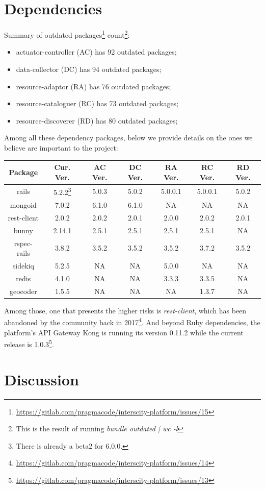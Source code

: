 \documentclass[paper=a4, fontsize=11pt]{scrartcl}
\numberwithin{equation}{section}    %
\numberwithin{figure}{section}      %
\numberwithin{table}{section}        %
\begin{document}
\section{Dependencies}
  Summary of outdated packages\footnote{\url{https://gitlab.com/pragmacode/interscity-platform/issues/15}} count\footnote{This is the result of running \textit{bundle outdated | wc -l}}:

  \begin{itemize}
    \item actuator-controller (AC) has 92 outdated packages;
    \item data-collector (DC) has 94 outdated packages;
    \item resource-adaptor (RA) has 76 outdated packages;
    \item resource-cataloguer (RC) has 73 outdated packages;
    \item resource-discoverer (RD) has 80 outdated packages;
  \end{itemize}

  Among all these dependency packages, below we provide details on the ones we believe are important to the project:

  \vspace{1em}

  \begin{center}
    \begin{tabu} to \textwidth {  c | c | c | c | c | c | c }
      \textbf{Package} & \textbf{Cur. Ver.} & \textbf{AC Ver.} & \textbf{DC Ver.} & \textbf{RA Ver.} & \textbf{RC Ver.} & \textbf{RD Ver.} \\ \hline \hline
      rails & 5.2.2\footnote{There is already a beta2 for 6.0.0.} & 5.0.3 & 5.0.2 & 5.0.0.1 & 5.0.0.1 & 5.0.2 \\ \hline
      mongoid & 7.0.2 & 6.1.0 & 6.1.0 & NA & NA & NA \\ \hline
      rest-client & 2.0.2 & 2.0.2 & 2.0.1 & 2.0.0 & 2.0.2 & 2.0.1 \\ \hline
      bunny & 2.14.1 & 2.5.1 & 2.5.1 & 2.5.1 & 2.5.1 & NA \\ \hline
      rspec-rails & 3.8.2 & 3.5.2 & 3.5.2 & 3.5.2 & 3.7.2 & 3.5.2 \\ \hline
      sidekiq & 5.2.5 & NA & NA & 5.0.0 & NA & NA \\ \hline
      redis & 4.1.0 & NA & NA & 3.3.3 & 3.3.5 & NA \\ \hline
      geocoder & 1.5.5 & NA & NA & NA & 1.3.7 & NA \\
    \end{tabu}
  \end{center}

  Among those, one that presents the higher risks is \textit{rest-client}, which has been abandoned by the community back in 2017\footnote{\url{https://gitlab.com/pragmacode/interscity-platform/issues/14}}. And beyond Ruby dependencies, the platform's API Gateway Kong is running its version 0.11.2 while the current release is 1.0.3\footnote{\url{https://gitlab.com/pragmacode/interscity-platform/issues/13}}.

\section{Discussion}
\label{sec:discussion}
\end{document}
